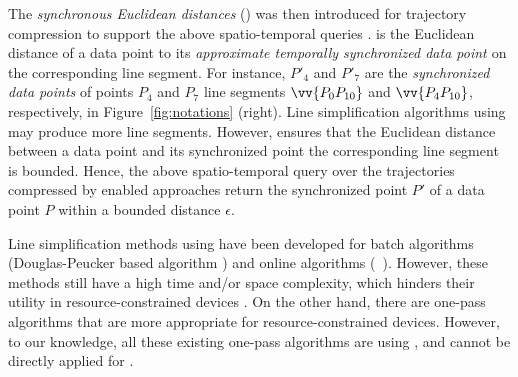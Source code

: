 

The \emph{synchronous Euclidean distances} (\sed) was then introduced for trajectory compression to support the above spatio-temporal queries \cite{Meratnia:Spatiotemporal}. \sed is the Euclidean distance of a data point to its \emph{approximate temporally synchronized data point \cite{Meratnia:Spatiotemporal}} on the corresponding line segment. For instance, $P'_4$ and $P'_7$ are the \emph{synchronized data points} of points $P_4$ and $P_7$ \wrt line segments $\vv{P_0P_{10}}$ and $\vv{P_4P_{10}}$, respectively, in Figure~\ref{fig:notations} (right).
Line simplification algorithms using \sed may produce more line segments. However, \sed ensures that the Euclidean distance between a data point and its  synchronized point \wrt the corresponding line segment is bounded. Hence, the above spatio-temporal query over the trajectories compressed by \sed enabled approaches return the synchronized point $P'$ of a data point $P$ within a bounded distance $\epsilon$.

Line simplification methods using \sed have been developed for batch algorithms (\eg Douglas-Peucker based algorithm \dpsed \cite{Meratnia:Spatiotemporal}) and online algorithms (\eg\ \squishe \cite{Muckell:Compression}).
However, these methods still have a high time and/or space complexity, which hinders their utility in resource-constrained devices \cite{Lin:Operb}.
On the other hand, there are one-pass algorithms \cite{Williams:Longest, Sklansky:Cone, Dunham:Cone, Zhao:Sleeve, Lin:Operb}  that are more appropriate for resource-constrained devices.  However, to our knowledge, all these existing one-pass algorithms are using \ped, and cannot be directly applied for \sed.



